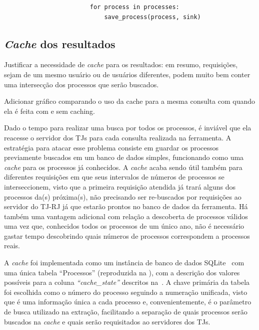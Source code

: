 \begin{listing}[htb]
\begin{minipage}[t]{0.6\textwidth}
\begin{verbatim}
                        for process in processes:
                            save_process(process, sink)
        \end{verbatim}
    \end{minipage}
    \caption{%
        Reprodução do procedimento de busca por processos de maneira sequencial
        (síncrona, à esquerda) e concorrente/não-bloqueante (assíncrona, à direita).
    }
    \label{lst:requisição-processos-síncrona-e-assíncrona}
\end{listing}


\subsection{\textit{Cache} dos resultados}

\begin{todolist}
    \item Justificar a necessidade de \textit{cache} para os resultados: em
          resumo, requisições, sejam de um mesmo usuário ou de usuários
          diferentes, podem muito bem conter uma intersecção dos processos que
          serão buscados.
    \item Adicionar gráfico comparando o uso da cache para a mesma consulta com
          quando ela é feita com e sem caching.
\end{todolist}

Dado o tempo para realizar uma busca por todos os processos, é inviável que ela
reacesse o servidor dos TJs para cada consulta realizada na ferramenta. A
estratégia para atacar esse problema consiste em guardar os processos
previamente buscados em um banco de dados simples, funcionando como uma
\textit{cache} para os processos já conhecidos. A \textit{cache} acaba sendo
útil também para diferentes requisições em que seus intervalos de números de
processos se interseccionem, visto que a primeira requisição atendida já trará
alguns dos processos da(s) próxima(s), não precisando ser re-buscados por
requisições ao servidor do TJ-RJ já que estarão prontos no banco de dados da
ferramenta. Há também uma vantagem adicional com relação a descoberta de
processos válidos uma vez que, conhecidos todos os processos de um único ano,
não é necessário gastar tempo descobrindo quais números de processos
correspondem a processos reais.

A \textit{cache} foi implementada como um instância de banco de dados
SQLite~\cite{tool:sqlite} com uma única tabela ``Processos'' (reproduzida na
), com a descrição dos valores possíveis
para a coluna \textit{``cache\_state''} descritos
na~. A chave primária da tabela foi escolhida
como o número do processo seguindo a numeração unificada, visto que é uma
informação única a cada processo e, convenientemente, é o parâmetro de busca
utilizado na extração, facilitando a separação de quais processos serão
buscados na \textit{cache} e quais serão requisitados ao servidores dos TJs.

